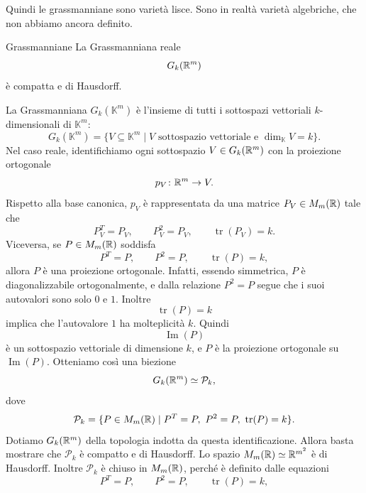 \documentclass[a4paper]{article}
\begin{document}
Quindi le grassmanniane sono varietà lisce.
Sono in realtà varietà algebriche, che non abbiamo ancora definito.

\pagebreak



\begin{snippetproposition}{Grassmanniane}
    La Grassmanniana reale
    \[
        G_k(\mathbb{R}^m)
    \]
    è compatta e di Hausdorff.
\end{snippetproposition}

\begin{snippetproof}{}
    La Grassmanniana \(G_k(\mathbb{K}^m)\) è l'insieme di tutti i sottospazi vettoriali \(k\)-dimensionali di \(\mathbb{K}^m\):
    \[
        G_k(\mathbb{K}^m)
        =
        \{V\subseteq\mathbb{K}^m\mid V \text{ sottospazio vettoriale e } \dim_{\mathbb{K}}V=k\}.
    \]
    Nel caso reale, identifichiamo ogni sottospazio \(V\in G_k(\mathbb{R}^m)\) con la proiezione ortogonale
    \[
        p_V\colon\mathbb{R}^m\to V.
    \]
    Rispetto alla base canonica, \(p_V\) è rappresentata da una matrice \(P_V\in M_m(\mathbb{R})\) tale che
    \[
        P_V^T=P_V,
        \qquad
        P_V^2=P_V,
        \qquad
        \operatorname{tr}(P_V)=k.
    \]
    Viceversa, se \(P\in M_m(\mathbb{R})\) soddisfa
    \[
        P^T=P,
        \qquad
        P^2=P,
        \qquad
        \operatorname{tr}(P)=k,
    \]
    allora \(P\) è una proiezione ortogonale. Infatti, essendo simmetrica, \(P\) è diagonalizzabile ortogonalmente, e dalla relazione \(P^2=P\) segue che i suoi autovalori sono solo \(0\) e \(1\). Inoltre
    \[
        \operatorname{tr}(P)=k
    \]
    implica che l'autovalore \(1\) ha molteplicità \(k\). Quindi
    \[
        \operatorname{Im}(P)
    \]
    è un sottospazio vettoriale di dimensione \(k\), e \(P\) è la proiezione ortogonale su \(\operatorname{Im}(P)\).
    Otteniamo così una biezione
    \[
        G_k(\mathbb{R}^m)
        \simeq
        \mathcal{P}_k,
    \]
    dove
    \[
        \mathcal{P}_k=
        \{P\in M_m(\realnumbers)\mid P^T=P,\ P^2=P,\ \operatorname{tr}(P)=k\}.
    \]
    Dotiamo \(G_k(\mathbb{R}^m)\) della topologia indotta da questa identificazione. Allora basta mostrare che \(\mathcal{P}_k\) è compatto e di Hausdorff.
    Lo spazio \(M_m(\mathbb{R})\simeq\mathbb{R}^{m^2}\) è di Hausdorff. Inoltre \(\mathcal{P}_k\) è chiuso in \(M_m(\mathbb{R})\), perché è definito dalle equazioni
    \[
        P^T=P,
        \qquad
        P^2=P,
        \qquad
        \operatorname{tr}(P)=k,
\]
\end{snippetproof}
\end{document}
